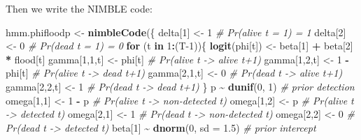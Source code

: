 \documentclass[
  12pt,
]{krantz}
\newenvironment{Shaded}{\begin{snugshade}}{\end{snugshade}}
\newcommand{\AttributeTok}[1]{\textcolor[rgb]{0.13,0.29,0.53}{#1}}
\newcommand{\CommentTok}[1]{\textcolor[rgb]{0.56,0.35,0.01}{\textit{#1}}}
\newcommand{\ControlFlowTok}[1]{\textcolor[rgb]{0.13,0.29,0.53}{\textbf{#1}}}
\newcommand{\DecValTok}[1]{\textcolor[rgb]{0.00,0.00,0.81}{#1}}
\newcommand{\FloatTok}[1]{\textcolor[rgb]{0.00,0.00,0.81}{#1}}
\newcommand{\FunctionTok}[1]{\textcolor[rgb]{0.13,0.29,0.53}{\textbf{#1}}}
\newcommand{\NormalTok}[1]{#1}
\newcommand{\OtherTok}[1]{\textcolor[rgb]{0.56,0.35,0.01}{#1}}
\newcommand{\SpecialCharTok}[1]{\textcolor[rgb]{0.81,0.36,0.00}{\textbf{#1}}}
\begin{document}
Then we write the NIMBLE code:

\begin{Shaded}
\begin{Highlighting}[]
\NormalTok{hmm.phifloodp }\OtherTok{\textless{}{-}} \FunctionTok{nimbleCode}\NormalTok{(\{}
\NormalTok{  delta[}\DecValTok{1}\NormalTok{] }\OtherTok{\textless{}{-}} \DecValTok{1}          \CommentTok{\# Pr(alive t = 1) = 1}
\NormalTok{  delta[}\DecValTok{2}\NormalTok{] }\OtherTok{\textless{}{-}} \DecValTok{0}          \CommentTok{\# Pr(dead t = 1) = 0}
  \ControlFlowTok{for}\NormalTok{ (t }\ControlFlowTok{in} \DecValTok{1}\SpecialCharTok{:}\NormalTok{(T}\DecValTok{{-}1}\NormalTok{))\{}
    \FunctionTok{logit}\NormalTok{(phi[t]) }\OtherTok{\textless{}{-}}\NormalTok{ beta[}\DecValTok{1}\NormalTok{] }\SpecialCharTok{+}\NormalTok{ beta[}\DecValTok{2}\NormalTok{] }\SpecialCharTok{*}\NormalTok{ flood[t]}
\NormalTok{    gamma[}\DecValTok{1}\NormalTok{,}\DecValTok{1}\NormalTok{,t] }\OtherTok{\textless{}{-}}\NormalTok{ phi[t]      }\CommentTok{\# Pr(alive t {-}\textgreater{} alive t+1)}
\NormalTok{    gamma[}\DecValTok{1}\NormalTok{,}\DecValTok{2}\NormalTok{,t] }\OtherTok{\textless{}{-}} \DecValTok{1} \SpecialCharTok{{-}}\NormalTok{ phi[t]  }\CommentTok{\# Pr(alive t {-}\textgreater{} dead t+1)}
\NormalTok{    gamma[}\DecValTok{2}\NormalTok{,}\DecValTok{1}\NormalTok{,t] }\OtherTok{\textless{}{-}} \DecValTok{0}        \CommentTok{\# Pr(dead t {-}\textgreater{} alive t+1)}
\NormalTok{    gamma[}\DecValTok{2}\NormalTok{,}\DecValTok{2}\NormalTok{,t] }\OtherTok{\textless{}{-}} \DecValTok{1}        \CommentTok{\# Pr(dead t {-}\textgreater{} dead t+1)}
\NormalTok{  \}}
\NormalTok{  p }\SpecialCharTok{\textasciitilde{}} \FunctionTok{dunif}\NormalTok{(}\DecValTok{0}\NormalTok{, }\DecValTok{1}\NormalTok{) }\CommentTok{\# prior detection}
\NormalTok{  omega[}\DecValTok{1}\NormalTok{,}\DecValTok{1}\NormalTok{] }\OtherTok{\textless{}{-}} \DecValTok{1} \SpecialCharTok{{-}}\NormalTok{ p    }\CommentTok{\# Pr(alive t {-}\textgreater{} non{-}detected t)}
\NormalTok{  omega[}\DecValTok{1}\NormalTok{,}\DecValTok{2}\NormalTok{] }\OtherTok{\textless{}{-}}\NormalTok{ p        }\CommentTok{\# Pr(alive t {-}\textgreater{} detected t)}
\NormalTok{  omega[}\DecValTok{2}\NormalTok{,}\DecValTok{1}\NormalTok{] }\OtherTok{\textless{}{-}} \DecValTok{1}        \CommentTok{\# Pr(dead t {-}\textgreater{} non{-}detected t)}
\NormalTok{  omega[}\DecValTok{2}\NormalTok{,}\DecValTok{2}\NormalTok{] }\OtherTok{\textless{}{-}} \DecValTok{0}        \CommentTok{\# Pr(dead t {-}\textgreater{} detected t)}
\NormalTok{  beta[}\DecValTok{1}\NormalTok{] }\SpecialCharTok{\textasciitilde{}} \FunctionTok{dnorm}\NormalTok{(}\DecValTok{0}\NormalTok{, }\AttributeTok{sd =} \FloatTok{1.5}\NormalTok{) }\CommentTok{\# prior intercept}

\end{Highlighting}
\end{Shaded}
\end{document}
